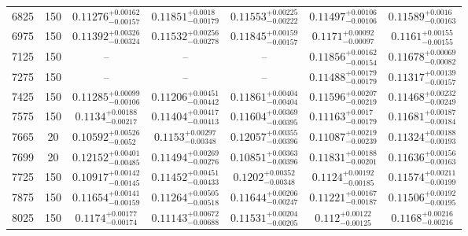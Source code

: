 \documentclass[twocolumn]{aastex63}
\begin{document}
\begin{table*}[ht!]
\begin{tabular}{ccccccc}
6825     &      150 &  $0.11276^{+0.00162}_{-0.00157}$ &   $0.11851^{+0.0018}_{-0.00179}$ &  $0.11553^{+0.00225}_{-0.00222}$ &  $0.11497^{+0.00106}_{-0.00106}$ &   $0.11589^{+0.0016}_{-0.00163}$ \\
6975     &      150 &  $0.11392^{+0.00326}_{-0.00324}$ &  $0.11532^{+0.00256}_{-0.00278}$ &  $0.11845^{+0.00159}_{-0.00157}$ &   $0.1171^{+0.00092}_{-0.00097}$ &   $0.1161^{+0.00155}_{-0.00155}$ \\
7125     &      150 &                              -- &                              -- &                              -- &  $0.11856^{+0.00162}_{-0.00154}$ &  $0.11678^{+0.00069}_{-0.00082}$ \\
7275     &      150 &                              -- &                              -- &                              -- &  $0.11488^{+0.00179}_{-0.00179}$ &  $0.11317^{+0.00139}_{-0.00157}$ \\
7425     &      150 &  $0.11285^{+0.00099}_{-0.00106}$ &  $0.11206^{+0.00451}_{-0.00442}$ &  $0.11861^{+0.00404}_{-0.00404}$ &  $0.11596^{+0.00207}_{-0.00219}$ &  $0.11468^{+0.00232}_{-0.00249}$ \\
7575     &      150 &   $0.1134^{+0.00188}_{-0.00217}$ &  $0.11404^{+0.00417}_{-0.00413}$ &  $0.11604^{+0.00369}_{-0.00395}$ &   $0.11163^{+0.0017}_{-0.00179}$ &  $0.11681^{+0.00187}_{-0.00184}$ \\
7665     &       20 &   $0.10592^{+0.00526}_{-0.0052}$ &   $0.1153^{+0.00297}_{-0.00348}$ &  $0.12057^{+0.00355}_{-0.00396}$ &  $0.11087^{+0.00219}_{-0.00239}$ &  $0.11324^{+0.00188}_{-0.00193}$ \\
7699     &       20 &  $0.12152^{+0.00401}_{-0.00485}$ &  $0.11494^{+0.00269}_{-0.00276}$ &  $0.10851^{+0.00363}_{-0.00396}$ &  $0.11831^{+0.00188}_{-0.00201}$ &  $0.11636^{+0.00156}_{-0.00163}$ \\
7725     &      150 &  $0.10917^{+0.00142}_{-0.00145}$ &  $0.11452^{+0.00451}_{-0.00433}$ &   $0.1202^{+0.00352}_{-0.00348}$ &   $0.1124^{+0.00192}_{-0.00185}$ &  $0.11574^{+0.00211}_{-0.00199}$ \\
7875     &      150 &  $0.11654^{+0.00141}_{-0.00159}$ &  $0.11264^{+0.00505}_{-0.00518}$ &  $0.11644^{+0.00206}_{-0.00247}$ &  $0.11221^{+0.00167}_{-0.00187}$ &  $0.11506^{+0.00192}_{-0.00195}$ \\
8025     &      150 &   $0.1174^{+0.00177}_{-0.00174}$ &  $0.11143^{+0.00672}_{-0.00688}$ &  $0.11531^{+0.00204}_{-0.00205}$ &    $0.112^{+0.00122}_{-0.00125}$ &   $0.1168^{+0.00216}_{-0.00216}$ \\

\end{tabular}
\end{table*}
\end{document}
